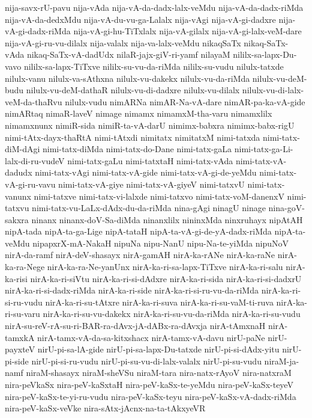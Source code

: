 {nija-savx-rU-pavu
nija-vAda
nija-vA-da-dadx-lalx-veMdu
nija-vA-da-dadx-riMda
nija-vA-da-dedxMdu
nija-vA-du-vu-ga-Lalalx
nija-vAgi
nija-vA-gi-dadxre
nija-vA-gi-dadx-riMda
nija-vA-gi-hu-TiTxlalx
nija-vA-gilalx
nija-vA-gi-lalx-veM-dare
nija-vA-gi-ru-vu-dilalx
nija-valalx
nija-va-lalx-veMdu
nikaqSaTx
nikaq-SaTx-vAda
nikaq-SaTx-vA-dadUdx
nilaR-jajx-giV-ri-yamf
nilayaM
nililx-sa-lapx-Du-vavo
nililx-sa-lapx-TiTxve
nililx-su-vu-da-riMda
nililx-su-vudu
nilulx-tatxde
nilulx-vanu
nilulx-va-sAthxna
nilulx-vu-dakekx
nilulx-vu-da-riMda
nilulx-vu-deM-budu
nilulx-vu-deM-dathaR
nilulx-vu-di-dadxre
nilulx-vu-dilalx
nilulx-vu-di-lalx-veM-da-thaRvu
nilulx-vudu
nimARNa
nimAR-Na-vA-dare
nimAR-pa-ka-vA-gide
nimARtaq
nimaR-laveV
nimage
nimamx
nimamxM-tha-varu
nimamxlilx
nimamxnunx
nimiR-sida
nimiR-ta-vA-darU
nimimx-babxra
nimimx-babx-rigU
nimi-tAtx-dayx-thaRtA
nimi-tAtxdi
nimitatx
nimitatxM
nimi-tatxda
nimi-tatx-diM-dAgi
nimi-tatx-diMda
nimi-tatx-do-Dane
nimi-tatx-gaLa
nimi-tatx-ga-Li-lalx-di-ru-vudeV
nimi-tatx-gaLu
nimi-tatxtaH
nimi-tatx-vAda
nimi-tatx-vA-dadudx
nimi-tatx-vAgi
nimi-tatx-vA-gide
nimi-tatx-vA-gi-de-yeMdu
nimi-tatx-vA-gi-ru-vavu
nimi-tatx-vA-giye
nimi-tatx-vA-giyeV
nimi-tatxvU
nimi-tatx-vanunx
nimi-tatxve
nimi-tatx-vi-lalxde
nimi-tatxvo
nimi-tatx-voM-danenxV
nimi-tatxvu
nimi-tatx-vu-LaLx-dAdx-du-da-riMda
nina-gAgi
ninagU
ninage
nina-goV-sakxra
ninanx
ninanx-doV-Sa-diMda
ninanxlilx
nininxMda
ninxruhayx
nipAtAH
nipA-tada
nipA-ta-ga-Lige
nipA-tataH
nipA-ta-vA-gi-de-yA-dadx-riMda
nipA-ta-veMdu
nipapxrX-mA-NakaH
nipuNa
nipu-NanU
nipu-Na-te-yiMda
nipuNoV
nirA-da-ramf
nirA-deV-shasayx
nirA-gamAH
nirA-ka-rANe
nirA-ka-raNe
nirA-ka-ra-Nege
nirA-ka-ra-Ne-yanUnx
nirA-ka-ri-sa-lapx-TiTxve
nirA-ka-ri-salu
nirA-ka-risi
nirA-ka-ri-siVtu
nirA-ka-ri-si-dAdxre
nirA-ka-ri-sida
nirA-ka-ri-si-dadxrU
nirA-ka-ri-si-dadx-riMda
nirA-ka-ri-side
nirA-ka-ri-si-ru-vu-da-riMda
nirA-ka-ri-si-ru-vudu
nirA-ka-ri-su-tAtxre
nirA-ka-ri-suva
nirA-ka-ri-su-vaM-ti-ruva
nirA-ka-ri-su-varu
nirA-ka-ri-su-vu-dakekx
nirA-ka-ri-su-vu-da-riMda
nirA-ka-ri-su-vudu
nirA-su-reV-rA-su-ri-BAR-ra-dAvx-jA-dABx-ra-dAvxja
nirA-tAmxnaH
nirA-tamxkA
nirA-tamx-vA-da-sa-kitxshacx
nirA-tamx-vA-davu
nirU-paNe
nirU-payxteV
nirU-pi-sa-lA-gide
nirU-pi-sa-lapx-Du-tatxde
nirU-pi-si-dAdx-yitu
nirU-pi-side
nirU-pi-si-ru-vudu
nirU-pi-su-vu-di-lalx-valalx
nirU-pi-su-vudu
niraM-ja-namf
niraM-shasayx
niraM-sheVSu
niraM-tara
nira-natx-rAyoV
nira-natxraM
nira-peVkaSx
nira-peV-kaSxtaH
nira-peV-kaSx-te-yeMdu
nira-peV-kaSx-teyeV
nira-peV-kaSx-te-yi-ru-vudu
nira-peV-kaSx-teyu
nira-peV-kaSx-vA-dadx-riMda
nira-peV-kaSx-veVke
nira-sAtx-jAcnx-na-ta-tAkxyeVR
}
